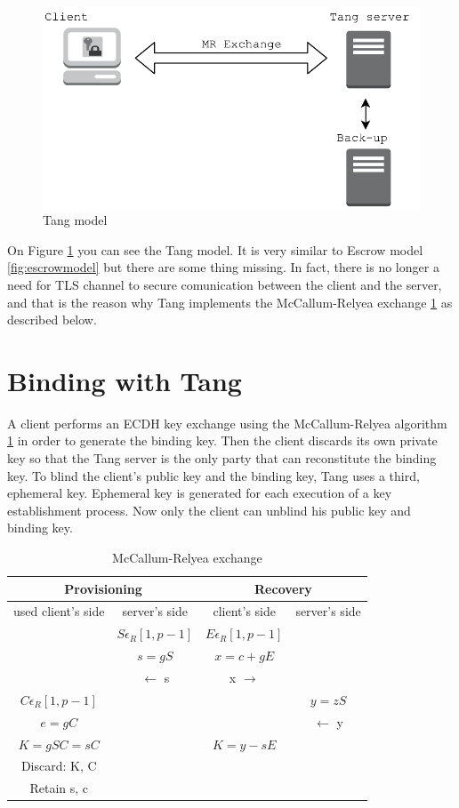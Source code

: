 \begin{figure}[h]
    \centering
    \includegraphics[scale=0.7]{figures/TangModel.pdf}
    \caption{Tang model}
    \label{fig:tangmodel}
\end{figure}

On Figure \ref{fig:tangmodel} you can see the Tang model.
It is very similar to Escrow model \ref{fig:escrowmodel} but there are some thing missing.
In fact, there is no longer a need for TLS channel to secure comunication between the client and the server,
 and that is the reason why Tang implements the McCallum-Relyea exchange \ref{mrexchange} as described below.

\section{Binding with Tang}

A client performs an ECDH key exchange using the McCallum-Relyea algorithm \ref{mrexchange} in order to generate the binding key.
Then the client discards its own private key so that the Tang server is the only party that can reconstitute the binding key.
To blind  the client's public key and the binding key, Tang uses a third, ephemeral key.
Ephemeral key is generated for each execution of a key establishment process.
Now only the client can unblind his public key and binding key.

\begin{table}[h]
\centering
\label{mrexchange}
\begin{tabular}{c|c|c|c}
\hline
\multicolumn{2}{c|}{Provisioning} & \multicolumn{2}{c}{Recovery} \\ \hline  used
client's side & server's side & client's side & server's side \\ \hline
 & $ S \epsilon _{R} [1, p-1]$ & $E \epsilon _{R} [1, p-1]$ &  \\
 & $s = gS$ &$ x = c + gE$ &  \\
 & $\leftarrow$  s &  x $\rightarrow$ &  \\
$C \epsilon _{R} [1, p-1]$ &  &  & $y = zS $\\
$e = gC $&  &  & $\leftarrow$ y \\
$K = gSC = sC$ &  & $K = y - sE $&  \\
Discard: K, C &  &  &  \\
Retain s, c &  &  &  \\ \hline
\end{tabular}
\caption{McCallum-Relyea exchange}
\end{table}

